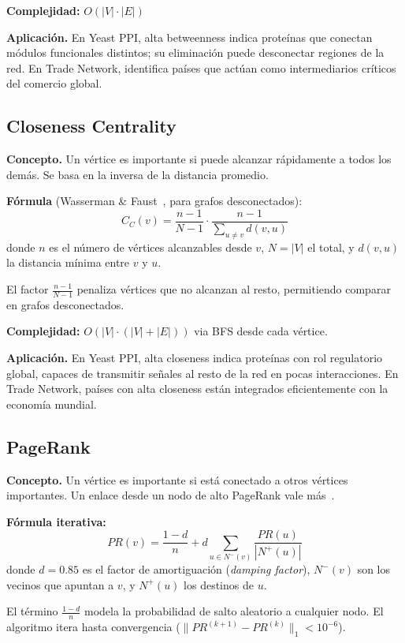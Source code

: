 \textbf{Complejidad:} $O(|V| \cdot |E|)$

\textbf{Aplicación.} En Yeast PPI, alta betweenness indica proteínas que conectan
módulos funcionales distintos; su eliminación puede desconectar regiones de la red.
En Trade Network, identifica países que actúan como intermediarios críticos del
comercio global.

\subsection{Closeness Centrality}

\textbf{Concepto.} Un vértice es importante si puede alcanzar rápidamente a todos
los demás. Se basa en la inversa de la distancia promedio.

\textbf{Fórmula} (Wasserman \& Faust~\cite{wasserman1994}, para grafos desconectados):
\[
C_C(v) = \frac{n-1}{N-1} \cdot \frac{n-1}{\displaystyle\sum_{u \neq v} d(v,u)}
\]
donde $n$ es el número de vértices alcanzables desde $v$, $N = |V|$ el total,
y $d(v,u)$ la distancia mínima entre $v$ y $u$.

El factor $\frac{n-1}{N-1}$ penaliza vértices que no alcanzan al resto, permitiendo
comparar en grafos desconectados.

\textbf{Complejidad:} $O(|V| \cdot (|V|+|E|))$ via BFS desde cada vértice.

\textbf{Aplicación.} En Yeast PPI, alta closeness indica proteínas con rol
regulatorio global, capaces de transmitir señales al resto de la red en pocas
interacciones. En Trade Network, países con alta closeness están integrados
eficientemente con la economía mundial.

\subsection{PageRank}

\textbf{Concepto.} Un vértice es importante si está conectado a otros vértices
importantes. Un enlace desde un nodo de alto PageRank vale más~\cite{pagerank1999}.

\textbf{Fórmula iterativa:}
\[
PR(v) = \frac{1-d}{n} + d \sum_{u \in N^{-}(v)} \frac{PR(u)}{|N^{+}(u)|}
\]
donde $d = 0.85$ es el factor de amortiguación (\textit{damping factor}),
$N^{-}(v)$ son los vecinos que apuntan a $v$, y $N^{+}(u)$ los destinos de $u$.

El término $\frac{1-d}{n}$ modela la probabilidad de salto aleatorio a cualquier nodo.
El algoritmo itera hasta convergencia ($\|PR^{(k+1)} - PR^{(k)}\|_1 < 10^{-6}$).

